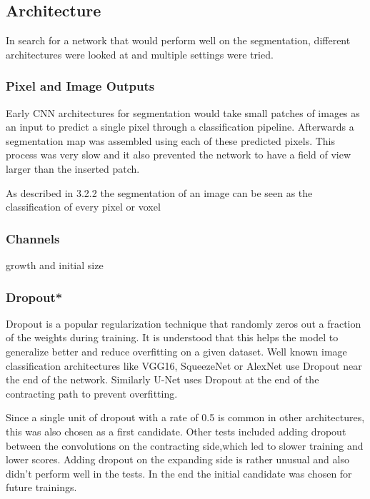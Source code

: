 \subsection{Architecture}

In search for a network that would perform well on the segmentation, different architectures were looked at and multiple settings were tried.

\subsubsection{Pixel and Image Outputs}

Early CNN architectures for segmentation would take small patches of images as an input to predict a single pixel through a classification pipeline. Afterwards a segmentation map was assembled using each of these predicted pixels. This process was very slow and it also prevented the network to have a field of view larger than the inserted patch.



As described in 3.2.2 the segmentation of an image can be seen as the classification of every pixel or voxel


\subsubsection{Channels}

growth and initial size

\subsubsection{Dropout*}

Dropout is a popular regularization technique that randomly zeros out a fraction of the weights during training. It is understood that this helps the model to generalize better and reduce overfitting on a given dataset. Well known image classification architectures like VGG16, SqueezeNet or AlexNet use Dropout near the end of the network. Similarly U-Net uses Dropout at the end of the contracting path to prevent overfitting.

Since a single unit of dropout with a rate of 0.5 is common in other architectures, this was also chosen as a first candidate. Other tests included adding dropout between the convolutions on the contracting side,which led to slower training and lower scores. Adding dropout on the expanding side is rather unusual and also didn't perform well in the tests. In the end the initial candidate was chosen for future trainings.

